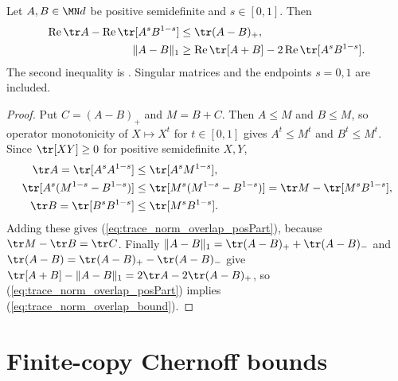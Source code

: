\begin{lemma}
    \label{lem:trace_norm_overlap_bound}
    \leanok
    Let $A,B\in\MN d$ be positive semidefinite and $s\in[0,1]$. Then
    \begin{align}
        \operatorname{Re}\tr A-\operatorname{Re}\tr[A^sB^{1-s}]
            &\le\tr(A-B)_+,
        \label{eq:trace_norm_overlap_posPart}\\
        \lVert A-B\rVert_1
            &\ge\operatorname{Re}\tr[A+B]-2\operatorname{Re}\tr[A^sB^{1-s}].
        \label{eq:trace_norm_overlap_bound}
    \end{align}
    The second inequality is \cite[Equation~(8.54)]{Wolf2012Quantum}. Singular
    matrices and the endpoints $s=0,1$ are included.
\end{lemma}
\begin{proof}
    \leanok
    Put $C=(A-B)_+$ and $M=B+C$. Then $A\le M$ and $B\le M$, so operator
    monotonicity of $X\mapsto X^t$ for $t\in[0,1]$ gives $A^t\le M^t$ and
    $B^t\le M^t$. Since $\tr[XY]\ge0$ for positive semidefinite $X,Y$,
    \begin{align}
        \tr A=\tr[A^sA^{1-s}]&\le\tr[A^sM^{1-s}],
        \label{eq:trace_norm_overlap_first}\\
        \tr[A^s(M^{1-s}-B^{1-s})]&\le\tr[M^s(M^{1-s}-B^{1-s})]
            =\tr M-\tr[M^sB^{1-s}],
        \label{eq:trace_norm_overlap_second}\\
        \tr B=\tr[B^sB^{1-s}]&\le\tr[M^sB^{1-s}].
        \label{eq:trace_norm_overlap_third}
    \end{align}
    Adding these gives (\ref{eq:trace_norm_overlap_posPart}), because
    $\tr M-\tr B=\tr C$. Finally
    $\lVert A-B\rVert_1=\tr(A-B)_++\tr(A-B)_-$ and
    $\tr(A-B)=\tr(A-B)_+-\tr(A-B)_-$ give
    $\tr[A+B]-\lVert A-B\rVert_1=2\tr A-2\tr(A-B)_+$, so
    (\ref{eq:trace_norm_overlap_posPart}) implies
    (\ref{eq:trace_norm_overlap_bound}).
\end{proof}

\section{Finite-copy Chernoff bounds}

